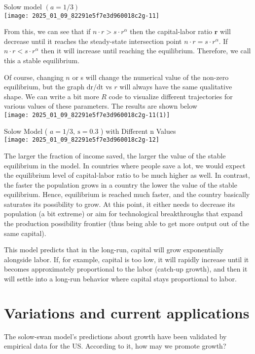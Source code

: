 \documentclass[10pt]{article}
\begin{document}
Solow model $(a=1 / 3)$\\
\texttt{[image: 2025\_01\_09\_82291e5f7e3d960018c2g-11]}

From this, we can see that if $n \cdot r>s \cdot r^{\alpha}$ then the capital-labor ratio $\mathbf{r}$ will decrease until it reaches the steady-state intersection point $n \cdot r=s \cdot r^{\alpha}$. If $n \cdot r<s \cdot r^{\alpha}$ then it will increase until reaching the equilibrium. Therefore, we call this a stable equilibrium.

Of course, changing $n$ or s will change the numerical value of the non-zero equilibrium, but the graph $\mathrm{dr} / \mathrm{dt}$ vs $r$ will always have the same qualitative shape. We can write a bit more $R$ code to visualize different trajectories for various values of these parameters. The results are shown below\\
\texttt{[image: 2025\_01\_09\_82291e5f7e3d960018c2g-11(1)]}

Solow Model ( $a=1 / 3, \mathrm{~s}=0.3$ ) with Different n Values\\
\texttt{[image: 2025\_01\_09\_82291e5f7e3d960018c2g-12]}

The larger the fraction of income saved, the larger the value of the stable equilibrium in the model. In countries where people save a lot, we would expect the equilibrium level of capital-labor ratio to be much higher as well. In contrast, the faster the population grows in a country the lower the value of the stable equilibrium. Hence, equilibrium is reached much faster, and the country basically saturates its possibility to grow. At this point, it either needs to decrease its population (a bit extreme) or aim for technological breakthroughs that expand the production possibility frontier (thus being able to get more output out of the same capital).

This model predicts that in the long-run, capital will grow exponentially alongside labor. If, for example, capital is too low, it will rapidly increase until it becomes approximately proportional to the labor (catch-up growth), and then it will settle into a long-run behavior where capital stays proportional to labor.

\section*{Variations and current applications}
The solow-swan model's predictions about growth have been validated by empirical data for the US. According to it, how may we promote growth?
\end{document}
